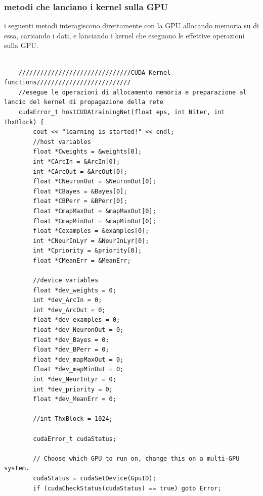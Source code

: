 \documentclass[10pt,a4paper]{article}
\begin{document}
\subsubsection{metodi che lanciano i kernel sulla GPU}
i seguenti metodi interagiscono direttamente con la GPU allocando memoria su di essa, caricando i dati, e lanciando i kernel che eseguono le effettive operazioni sulla GPU.  

\begin{lstlisting}[style=mycuda, caption= classe di interfaccia alla GPU, captionpos=b]
	
	///////////////////////////////CUDA Kernel functions//////////////////////////
	//esegue le operazioni di allocamento memoria e preparazione al lancio del kernel di propagazione della rete
	cudaError_t hostCUDAtrainingNet(float eps, int Niter, int ThxBlock) {
		cout << "learning is started!" << endl;
		//host variables
		float *Cweights = &weights[0];
		int *CArcIn = &ArcIn[0];
		int *CArcOut = &ArcOut[0];
		float *CNeuronOut = &NeuronOut[0];
		float *CBayes = &Bayes[0];
		float *CBPerr = &BPerr[0];
		float *CmapMaxOut = &mapMaxOut[0];
		float *CmapMinOut = &mapMinOut[0];
		float *Cexamples = &examples[0];
		int *CNeurInLyr = &NeurInLyr[0];
		int *Cpriority = &priority[0];
		float *CMeanErr = &MeanErr;

		//device variables
		float *dev_weights = 0;
		int *dev_ArcIn = 0;
		int *dev_ArcOut = 0;
		float *dev_examples = 0;
		float *dev_NeuronOut = 0;
		float *dev_Bayes = 0;
		float *dev_BPerr = 0;
		float *dev_mapMaxOut = 0;
		float *dev_mapMinOut = 0;
		int *dev_NeurInLyr = 0;
		int *dev_priority = 0;
		float *dev_MeanErr = 0;

		//int ThxBlock = 1024;

		cudaError_t cudaStatus;

		// Choose which GPU to run on, change this on a multi-GPU system.
		cudaStatus = cudaSetDevice(GpuID);
		if (cudaCheckStatus(cudaStatus) == true) goto Error;


\end{lstlisting}
\end{document}

